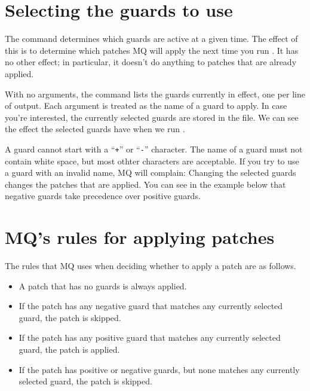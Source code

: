 \section{Selecting the guards to use}

The  command determines which guards are active at a
given time.  The effect of this is to determine which patches MQ will
apply the next time you run .  It has no other effect; in
particular, it doesn't do anything to patches that are already
applied.

With no arguments, the  command lists the guards
currently in effect, one per line of output.  Each argument is treated
as the name of a guard to apply.
In case you're interested, the currently selected guards are stored in
the  file.
We can see the effect the selected guards have when we run
.

A guard cannot start with a ``\texttt{+}'' or ``\texttt{-}''
character.  The name of a guard must not contain white space, but most
othter characters are acceptable.  If you try to use a guard with an
invalid name, MQ will complain:
Changing the selected guards changes the patches that are applied.
You can see in the example below that negative guards take precedence
over positive guards.

\section{MQ's rules for applying patches}

The rules that MQ uses when deciding whether to apply a patch
are as follows.
\begin{itemize}
\item A patch that has no guards is always applied.
\item If the patch has any negative guard that matches any currently
  selected guard, the patch is skipped.
\item If the patch has any positive guard that matches any currently
  selected guard, the patch is applied.
\item If the patch has positive or negative guards, but none matches
  any currently selected guard, the patch is skipped.
\end{itemize}

